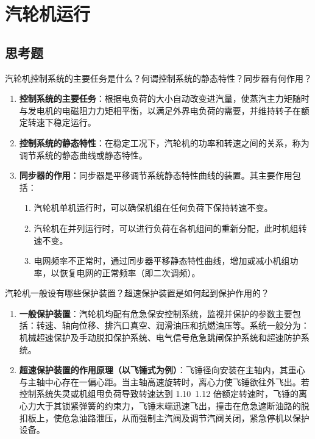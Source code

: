\chapter{汽轮机运行}

\section{思考题}

\begin{problem}
汽轮机控制系统的主要任务是什么？何谓控制系统的静态特性？同步器有何作用？
\end{problem}

\begin{solution}
\begin{enumerate}
  \item \textbf{控制系统的主要任务}：根据电负荷的大小自动改变进汽量，使蒸汽主力矩随时与发电机的电磁阻力力矩相平衡，以满足外界电负荷的需要，并维持转子在额定转速下稳定运行。
  \item \textbf{控制系统的静态特性}：在稳定工况下，汽轮机的功率和转速之间的关系，称为调节系统的静态曲线或静态特性。
  \item \textbf{同步器的作用}：同步器是平移调节系统静态特性曲线的装置。其主要作用包括：
  \begin{enumerate}
    \item 汽轮机单机运行时，可以确保机组在任何负荷下保持转速不变。
    \item 汽轮机在并列运行时，可以进行负荷在各机组间的重新分配，此时机组转速不变。
    \item 电网频率不正常时，通过同步器平移静态特性曲线，增加或减小机组功率，以恢复电网的正常频率（即二次调频）。
  \end{enumerate}
\end{enumerate}
\end{solution}

\begin{problem}
汽轮机一般设有哪些保护装置？超速保护装置是如何起到保护作用的？
\end{problem}

\begin{solution}
\begin{enumerate}
  \item \textbf{一般保护装置}：汽轮机均配有危急保安控制系统，监视并保护的参数主要包括：转速、轴向位移、排汽口真空、润滑油压和抗燃油压等。系统一般分为：机械超速保护及手动脱扣保护系统、电气信号危急跳闸保护系统和超速防护系统。
  \item \textbf{超速保护装置的作用原理（以飞锤式为例）}：飞锤径向安装在主轴内，其重心与主轴中心存在一偏心距。当主轴高速旋转时，离心力使飞锤欲往外飞出。若控制系统失灵或机组甩负荷导致转速达到 1.10~1.12 倍额定转速时，飞锤的离心力大于其锁紧弹簧的约束力，飞锤末端迅速飞出，撞击在危急遮断油路的脱扣板上，使危急油路泄压，从而强制主汽阀及调节汽阀关闭，紧急停机以保护设备。
\end{enumerate}
\end{solution}

